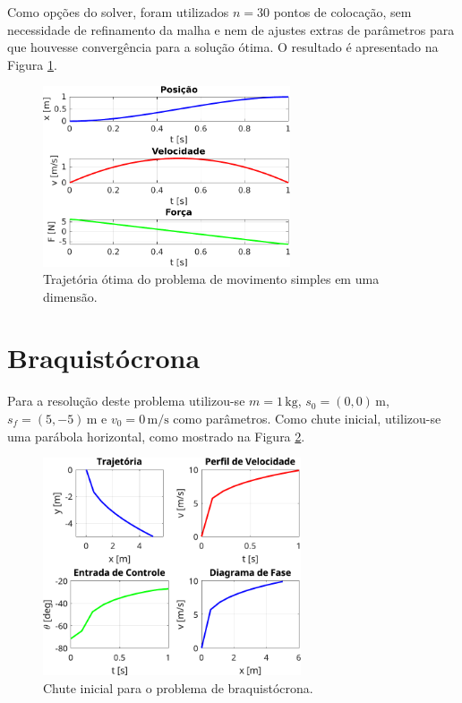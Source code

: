 Como opções do solver, foram utilizados $n=30$ pontos de colocação, sem necessidade de refinamento da malha e nem de ajustes extras de parâmetros para que houvesse convergência para a solução ótima. O resultado é apresentado na Figura \ref{fig:resultados-movimento-simples}.

\begin{figure}[H]
    \centering
    \includegraphics[width=0.65\textwidth]{Cap4/figuras/movimento-simples.pdf}
    \caption{Trajetória ótima do problema de movimento simples em uma dimensão.}
    \label{fig:resultados-movimento-simples}
\end{figure}


\section{Braquistócrona}
\label{sec:resultados-braquistocrona}

Para a resolução deste problema utilizou-se $m=1 \, \si{\kilo\gram}$, $s_{0}=(0,0) \, \si{\meter}$, $s_{f}=(5,-5) \, \si{\meter}$ e $v_0=0 \, \si{\meter\per\second}$ como parâmetros. Como chute inicial, utilizou-se uma parábola horizontal, como mostrado na Figura \ref{fig:resultados-braquistocrona-chute}.

\begin{figure}[H]
    \centering
    \includegraphics[width=0.68\textwidth]{Cap4/figuras/braquistocrona-chute.pdf}
    \caption{Chute inicial para o problema de braquistócrona.}
    \label{fig:resultados-braquistocrona-chute}
\end{figure}


